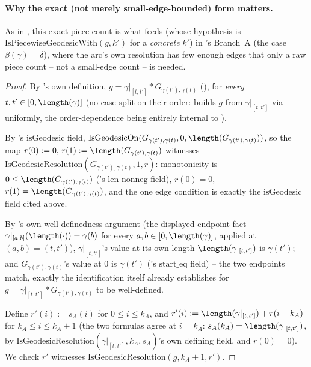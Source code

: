 \begin{lemma}
  \paragraph{Why the exact (not merely small-edge-bounded) form matters.} As in
  , this exact piece count is what feeds
   (whose hypothesis is $\mathrm{IsPiecewiseGeodesicWith}(g,k')$ for a
  \emph{concrete} $k'$) in 's Branch~A (the case $\beta(\gamma)=\delta$), where
  the arc's own resolution has few enough edges that only a raw piece count -- not a small-edge
  count -- is needed.
\end{lemma}
\begin{proof}
  By 's own definition, $g = \gamma|_{[t,t']} * G_{\gamma(t'),\gamma(t)}$
  (), for \emph{every} $t,t' \in [0,\length(\gamma)]$ (no case split on their
  order:  builds $g$ from $\gamma|_{[t,t']}$ via  uniformly,
  the order-dependence being entirely internal to ).

  By 's $\mathrm{isGeodesic}$ field,
  $\mathrm{IsGeodesicOn}(G_{\gamma(t'),\gamma(t)},0,\length(G_{\gamma(t'),\gamma(t)}))$, so the map
  $r(0):=0,\,r(1):=\length(G_{\gamma(t'),\gamma(t)})$ witnesses
  $\mathrm{IsGeodesicResolution}(G_{\gamma(t'),\gamma(t)},1,r)$: monotonicity is
  $0\le\length(G_{\gamma(t'),\gamma(t)})$ ('s $\mathrm{len\_nonneg}$ field), $r(0)=0$,
  $r(1)=\length(G_{\gamma(t'),\gamma(t)})$, and the one edge condition is exactly the
  $\mathrm{isGeodesic}$ field cited above.

  By 's own well-definedness argument (the displayed endpoint fact
  $\gamma|_{[a,b]}(\length(\cdot))=\gamma(b)$ for every $a,b\in[0,\length(\gamma)]$, applied at
  $(a,b)=(t,t')$), $\gamma|_{[t,t']}$'s value at its own length $\length(\gamma|_{[t,t']})$ is
  $\gamma(t')$; and $G_{\gamma(t'),\gamma(t)}$'s value at $0$ is $\gamma(t')$
  ('s $\mathrm{start\_eq}$ field) -- the two endpoints match, exactly the
  identification  itself already establishes for $g = \gamma|_{[t,t']} *
  G_{\gamma(t'),\gamma(t)}$ to be well-defined.

  Define $r'(i) := s_A(i)$ for $0\le i\le k_A$, and $r'(i) := \length(\gamma|_{[t,t']})+r(i-k_A)$
  for $k_A\le i\le k_A+1$ (the two formulas agree at $i=k_A$: $s_A(k_A)=\length(\gamma|_{[t,t']})$,
  by $\mathrm{IsGeodesicResolution}(\gamma|_{[t,t']},k_A,s_A)$'s own defining field, and $r(0)=0$).
  We check $r'$ witnesses $\mathrm{IsGeodesicResolution}(g,k_A+1,r')$.


\end{proof}
